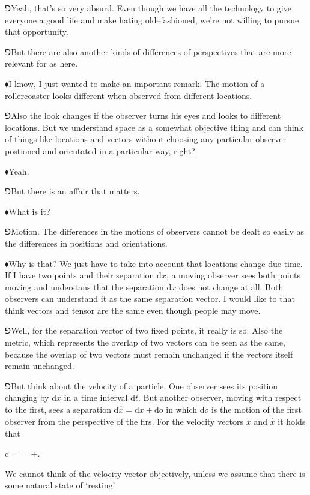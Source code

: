 \documentclass[10pt,oneside%
]{memoir}
\newenvironment{eqna}{\begin{IEEEeqnarray*}{c}}{\end{IEEEeqnarray*}\ignorespacesafterend}
\newcommand{\der}[2]{\frac{\dd#1}{\dd#2}}
\newcommand{\dd}{\mathrm{d}}
\newcommand{\primed}[1]{\hat{#1}}
\newcommand{\hea}{\(\blacklozenge\)\;}
\newcommand{\heb}{\(\Game\)\;}
\begin{document}
\heb Yeah, that's so very absurd. Even though we have all the technology to give everyone a good life and make hating old--fashioned, we're not willing to pursue that opportunity.

\heb But there are also another kinds of differences of perspectives that are more relevant for as here.

\hea I know, I just wanted to make an important remark. The motion of a rollercoaster looks different when observed from different locations.

\heb Also the look changes if the observer turns his eyes and looks to different locations. But we understand space as a somewhat objective thing and can think of things like locations and vectors without choosing any particular observer postioned and orientated in a particular way, right?

\hea Yeah.

\heb But there is an affair that matters.

\hea What is it?

\heb Motion. The differences in the motions of observers cannot be dealt so easily as the differences in positions and orientations.

\hea Why is that? We just have to take into account that locations change due time. If I have two points and their separation \(\dd x\), a moving observer sees both points moving and understans that the separation \(\dd x\) does not change at all. Both observers can understand it as the same separation vector. I would like to that think vectors and tensor are the same even though people may move.

\heb Well, for the separation vector of two fixed points, it really is so. Also the metric, which represents the overlap of two vectors can be seen as the same, because the overlap of two vectors must remain unchanged if the vectors itself remain unchanged.

\heb But think about the velocity of a particle. One observer sees its position changing by \(\dd x\) in a time interval \(\dd t\). But another observer, moving with respect to the first, sees a separation \(\dd\primed{x}=\dd x+\dd o\) in which \(\dd o\) is the motion of the first observer from the perspective of the firs. For the velocity vectors \(\dot{x}\) and \(\dot{\primed{x}}\) it holds that
\begin{eqna}
    \dot{\primed{x}}=\der{\primed{x}}{t}=\der{x+\dd o}{t}=+.
\end{eqna}
We cannot think of the velocity vector objectively, unless we assume that there is some natural state of `resting'.
\end{document}
